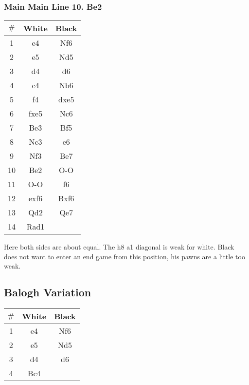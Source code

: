 \documentclass{article}
\newcommand{\smalls}{\par\smallskip}
\begin{document}
        \subsubsection*{Main Main Line 10. Be2}
        \begin{multicols}{2}
            \showboard
            \smalls
            \begin{tabular}{c|c|c}
                $\#$ & White & Black\\
                \hline
                1 & e4 & Nf6 \\
                2 & e5 & Nd5 \\
                3 & d4 & d6 \\
                4 & c4 & Nb6 \\
                5 & f4 & dxe5 \\
                6 & fxe5 & Nc6 \\
                7 & Be3 & Bf5 \\
                8 & Nc3 & e6 \\
                9 & Nf3 & Be7 \\
                10 & Be2 & O-O \\
                11 & O-O & f6 \\
                12 & exf6 & Bxf6 \\
                13 & Qd2 & Qe7 \\
                14 & Rad1 & \\
            \end{tabular}
        \end{multicols}
        Here both sides are about equal.  The h8 a1 diagonal is weak for white.
        Black does not want to enter an end game from this position, his pawns
        are a little too weak.

    \subsection*{Balogh Variation}


        \newgame
        \begin{multicols}{2}
            \showboard
            \smalls
            \begin{tabular}{c|c|c}
                $\#$ & White & Black\\
                \hline
                1 & e4 & Nf6 \\
                2 & e5 & Nd5 \\
                3 & d4 & d6 \\
                4 & Bc4 & \\
            \end{tabular}
        \end{multicols}
\end{document}
